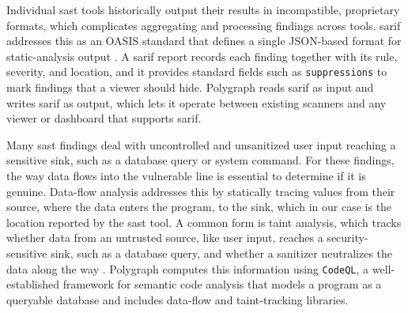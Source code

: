Individual \ac{sast} tools historically output their results in incompatible,
proprietary formats, which complicates aggregating and processing findings
across tools. \Ac{sarif} addresses this as an OASIS standard that defines a single
JSON-based format for static-analysis output \cite{sarif2020}. A \ac{sarif} report
records each finding together with its rule, severity, and location, and it
provides standard fields such as \texttt{suppressions} to mark findings that a
viewer should hide. Polygraph reads \ac{sarif} as input and writes \ac{sarif} as output,
which lets it operate between existing scanners and any viewer or dashboard that
supports \ac{sarif}.

Many \ac{sast} findings deal with uncontrolled and unsanitized user input reaching a sensitive sink, such as a database query or system command. For these findings, the way data flows into the vulnerable line is essential
to determine if it is genuine. Data-flow analysis addresses this by statically tracing values from their source, where the data enters the program, to the sink, which in our case is the location reported by the \ac{sast} tool.
A common form is taint analysis, which tracks whether data from an untrusted source, like user input, reaches a
security-sensitive sink, such as a database query, and whether a sanitizer
neutralizes the data along the way \cite{tripp2009taj}.
Polygraph computes this information using \texttt{CodeQL}\cite{codeql}, a well-established framework for semantic code analysis that models a program as a queryable database and includes data-flow and taint-tracking libraries.
